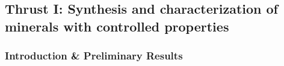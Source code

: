 


\newpage
\vspace{2mm}
\subsection{Thrust I: Synthesis and characterization of minerals with controlled properties}
\label{sec:SA1}

\vspace{1mm}
\subsubsection*{Introduction \& Preliminary Results}
\vspace{1mm}

